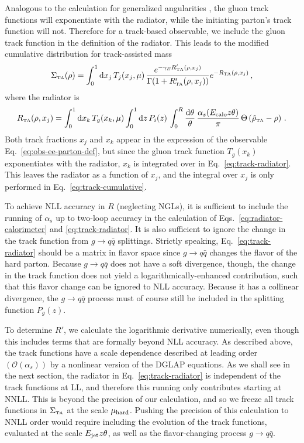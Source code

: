 \documentclass[letterpaper,11pt]{article}
\newcommand{\Eq}[1]{Eq.~\eqref{#1}}
\newcommand{\Eqs}[2]{Eqs.~\eqref{#1} and \eqref{#2}}
\begin{document}
Analogous to the calculation for generalized angularities \cite{Larkoski:2014pca}, the gluon track functions will exponentiate with the radiator, while the initiating parton's track function will not.
%
Therefore for a track-based observable, we include the gluon track function in the definition of the radiator.
%
This leads to the modified cumulative distribution for track-assisted mass
\begin{equation}
\label{eq:track-cumulative}
\Sigma_{\mbox{\tiny TA}}(\rho) = \int_0^1 \text{d}x_j \, T_j(x_j,\mu)\, \frac{e^{-\gamma_E R_{\mbox{\tiny TA}}'(\rho,x_j)}}{\Gamma(1+R_{\mbox{\tiny TA}}'(\rho,x_j))} e^{-R_{\mbox{\tiny TA}}(\rho,x_j)}\,,
\end{equation}
where the radiator is
\begin{equation}
\label{eq:track-radiator}
R_{\mbox{\tiny TA}}(\rho,x_j) = \int_0^1 \text{d}x_k\, T_g(x_k,\mu) \int_0^1 \text{d}z\,P_i(z)\, \int_0^R \frac{\text{d}\theta}{\theta} \,\frac{\alpha_s(E_{\rm calo}z\theta)}{\pi}\, \Theta\left(\hat{\rho}_{\mbox{\tiny TA}}-\rho\right)\,. 
\end{equation}
Both track fractions $x_j$ and $x_k$ appear in the expression of the observable \Eq{eq:obs-ee-parton-def}, but since the gluon track function $T_g(x_k)$ exponentiates with the radiator, $x_k$ is integrated over in \Eq{eq:track-radiator}. 
%
This leaves the radiator as a function of $x_j$, and the integral over $x_j$ is only performed in \Eq{eq:track-cumulative}.


To achieve NLL accuracy in $R$ (neglecting NGLs), it is sufficient to include the running of $\alpha_s$ up to two-loop accuracy in the calculation of \Eqs{eq:radiator-calorimeter}{eq:track-radiator}. 
%
It is also sufficient to ignore the change in the track function from $g \to q \bar{q}$ splittings.
%
Strictly speaking, \Eq{eq:track-radiator} should be a matrix in flavor space \cite{Dasgupta:2013ihk,Marzani:2017mva} since $g \to q \bar{q}$ changes the flavor of the hard parton.
%
Because $g \to q \bar{q}$ does not have a soft divergence, though, the change in the track function does not yield a logarithmically-enhanced contribution, such that this flavor change can be ignored to NLL accuracy.
%
Because it has a collinear divergence, the $g \to q \bar{q}$ process must of course still be included in the splitting function $P_g(z)$.


To determine $R'$, we calculate the logarithmic derivative numerically, even though this includes terms that are formally beyond NLL accuracy.
%
As described above, the track functions have a scale dependence described at leading order $(\mathcal{O}(\alpha_s))$ by a nonlinear version of the DGLAP equations. 
%
As we shall see in the next section, the radiator in \Eq{eq:track-radiator} is independent of the track functions at LL, and therefore this running only contributes starting at NNLL. 
%
This is beyond the precision of our calculation, and so we freeze all track functions in $\Sigma_{\mbox{\tiny TA}}$ at the scale $\mu_{\rm hard}$. 
%
Pushing the precision of this calculation to NNLL order would require including the evolution of the track functions, evaluated at the scale $E_{\rm jet}z\theta$, as well as the flavor-changing process $g \to q \bar{q}$. 
\end{document}

